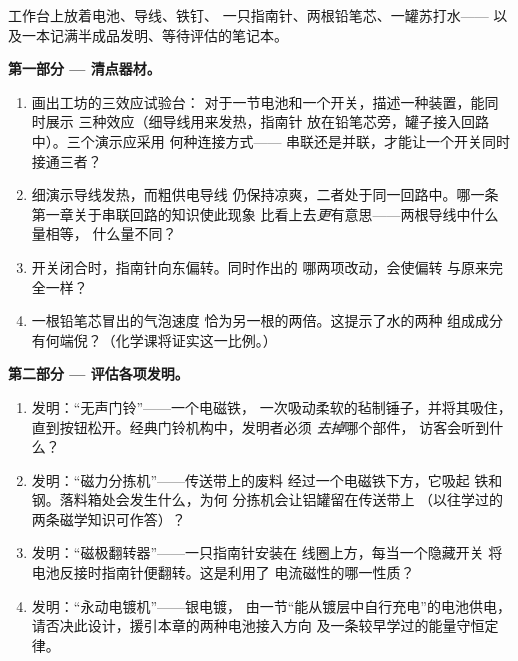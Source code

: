 \begin{problem}\label{pb:g8:electric-current-effects:1}
工作台上放着电池、导线、铁钉、
一只指南针、两根铅笔芯、一罐苏打水——
以及一本记满半成品发明、等待评估的笔记本。

\medskip\noindent\textbf{第一部分 --- 清点器材。}
\begin{enumerate}
  \item 画出工坊的三效应试验台：
        对于一节电池和一个开关，描述一种装置，能同时展示
        三种效应（细导线用来发热，指南针
        放在铅笔芯旁，罐子接入回路中）。三个演示应采用
        何种连接方式——
        串联还是并联，才能让一个开关同时接通三者？
  \item 细演示导线发热，而粗供电导线
        仍保持凉爽，二者处于同一回路中。哪一条
        第一章关于串联回路的知识使此现象
        比看上去\emph{更}有意思——两根导线中什么量相等，
        什么量不同？
  \item 开关闭合时，指南针向东偏转。同时作出的
        哪两项改动，会使偏转
        与原来完全一样？
  \item 一根铅笔芯冒出的气泡速度
        恰为另一根的两倍。这提示了水的两种
        组成成分有何端倪？（化学课将证实这一比例。）
\end{enumerate}

\medskip\noindent\textbf{第二部分 --- 评估各项发明。}
\begin{enumerate}[resume]
  \item 发明：“无声门铃”——一个电磁铁，
        一次吸动柔软的毡制锤子，并将其吸住，
        直到按钮松开。经典门铃机构中，发明者必须
        \emph{去掉}哪个部件，
        访客会听到什么？
  \item 发明：“磁力分拣机”——传送带上的废料
        经过一个电磁铁下方，它吸起
        铁和钢。落料箱处会发生什么，为何
        分拣机会让铝罐留在传送带上
        （以往学过的两条磁学知识可作答）？
  \item 发明：“磁极翻转器”——一只指南针安装在
        线圈上方，每当一个隐藏开关
        将电池反接时指南针便翻转。这是利用了
        电流磁性的哪一性质？
  \item 发明：“永动电镀机”——银电镀，
        由一节“能从镀层中自行充电”的电池供电，
        请否决此设计，援引本章的两种电池接入方向
        及一条较早学过的能量守恒定律。
\end{enumerate}


\end{problem}
